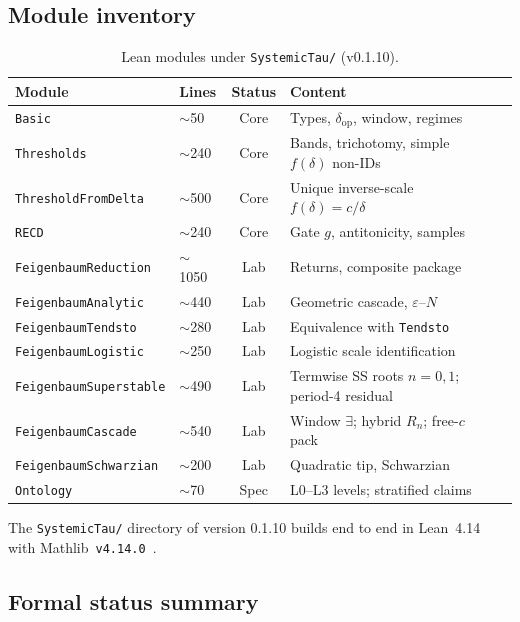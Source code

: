 \documentclass[11pt,a4paper]{article}
\newcommand{\deltaop}{\delta_{\mathrm{op}}}
\begin{document}
\subsection{Module inventory}

\begin{table}[H]
\centering
\caption{Lean modules under \texttt{SystemicTau/} (v0.1.10).}
\label{tab:modules}
\begin{tabular}{@{}llclp{5.4cm}@{}}
\toprule
\textbf{Module} & \textbf{Lines} & \textbf{Status} & \textbf{Content} \\
\midrule
\texttt{Basic} & \(\sim\)50 & Core & Types, \(\deltaop\), window, regimes \\
\texttt{Thresholds} & \(\sim\)240 & Core & Bands, trichotomy, simple \(f(\delta)\) non-IDs \\
\texttt{ThresholdFromDelta} & \(\sim\)500 & Core & Unique inverse-scale \(f(\delta)=c/\delta\) \\
\texttt{RECD} & \(\sim\)240 & Core & Gate \(g\), antitonicity, samples \\
\texttt{FeigenbaumReduction} & \(\sim\)1050 & Lab & Returns, composite package \\
\texttt{FeigenbaumAnalytic} & \(\sim\)440 & Lab & Geometric cascade, \(\varepsilon\)--\(N\) \\
\texttt{FeigenbaumTendsto} & \(\sim\)280 & Lab & Equivalence with \texttt{Tendsto} \\
\texttt{FeigenbaumLogistic} & \(\sim\)250 & Lab & Logistic scale identification \\
\texttt{FeigenbaumSuperstable} & \(\sim\)490 & Lab & Termwise SS roots \(n=0,1\); period-4 residual \\
\texttt{FeigenbaumCascade} & \(\sim\)540 & Lab & Window \(\exists\); hybrid \(R_n\); free-\(c\) pack \\
\texttt{FeigenbaumSchwarzian} & \(\sim\)200 & Lab & Quadratic tip, Schwarzian \\
\texttt{Ontology} & \(\sim\)70 & Spec & L0--L3 levels; stratified claims \\
\bottomrule
\end{tabular}
\end{table}

The \texttt{SystemicTau/} directory of version 0.1.10 builds end to end in Lean~4.14 with Mathlib~\texttt{v4.14.0}~\cite{lean4,mathlib}.

\subsection{Formal status summary}
\end{document}
